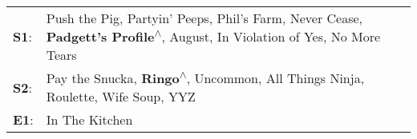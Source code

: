 \begin{supertabular}{p{0.03\textwidth}p{0.92\textwidth}}
 \textbf{S1}:  &  Push the Pig\textsuperscript{}, \enspace Partyin' Peeps\textsuperscript{}, \enspace Phil's Farm\textsuperscript{}, \enspace Never Cease\textsuperscript{}, \enspace \textbf{Padgett's Profile\textsuperscript{$\wedge$}}, \enspace August\textsuperscript{}, \enspace In Violation of Yes\textsuperscript{}, \enspace No More Tears\textsuperscript{}  \enspace  \\
 \textbf{S2}:  &                                                                       Pay the Snucka\textsuperscript{}, \enspace \textbf{Ringo\textsuperscript{$\wedge$}}, \enspace Uncommon\textsuperscript{}, \enspace All Things Ninja\textsuperscript{}, \enspace Roulette\textsuperscript{}, \enspace Wife Soup\textsuperscript{}, \enspace YYZ\textsuperscript{}  \enspace  \\
 \textbf{E1}:  &                                                                                                                                                                                                                                                                                                                       In The Kitchen\textsuperscript{}  \enspace  \\
\end{supertabular}
